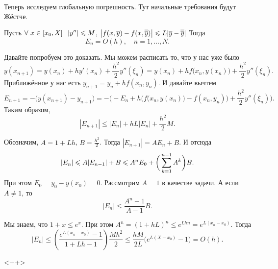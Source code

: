 Теперь исследуем глобальную погрешность. Тут начальные требования будут Жёстче.
\begin{The}
Пусть $\forall\ x\in [x_0,X]\pau |y''|\le M$, $\big|f(x,\overline{y}) - f(x,\overline{\overline{y}})\big| \leqslant L |\overline{y} - \overline{\overline{y}}|$ Тогда
\[
  E_n = O(h),\quad n=1,\dots, N.
\]
\end{The}
\begin{Proof}
Давайте попробуем это доказать.
Мы можем расписать то, что у нас уже было
\[
  y(x_{n+1}) = y(x_n) + h y'(x_n) + \frac{h^2}2y''(\xi_n) = 
  y(x_n) + h f\big(x_n,y(x_n)\big) + \frac{h^2}2y''(\xi_n).
\]
Приближённое у нас есть $y_{n+1} = y_n + h f(x_n,y_n)$. И давайте вычтем
\[
  E_{n+1} = -\big(y(x_{n+1}) - y_{n+1}\big) = -\bigg(-E_n + h \Big(f\big(x_n,y(x_n)\big) - f(x_n,y_n)\Big) + \frac{h^2}2y''(\xi_n)\bigg).
\]
Таким образом, 
\[
  |E_{n+1}|\le |E_n| + h L |E_n| + \frac {h^2}2 M.
\]

Обозначим, $A= 1+ Lh$, $B = \frac{h^2}2$. Тогда $|E_{n+1}| = A E_n + B$. И отсюда
\[
  |E_n| \leqslant A |E_{n-1}| + B \leqslant A^n E_0 + \bigg(\sum\limits_{k = 1}^{n-1} A^k\bigg)B.
\]
При этом $E_0 = y_0 - y(x_0)=0$. Рассмотрим $A=1$  в качестве задачи. А если $A\ne 1$, то 
\[
  |E_n| \le \frac{A^n-1}{A-1} B.
\]

Мы знаем, что $1+x\le e^x$. При этом $A^n = (1+hL)^n\le e^{Lhn} = e^{L(x_n-x_0)}$. Тогда
\[
  |E_n| \le \left( \frac{e^{L(x_n-x_0)} - 1}{1+ Lh - 1} \right)\frac{Mh^2}2 \le \frac{h M}{2L} \big(e^{L(X-x_0)}-1\big) = O(h).
\]
\end{Proof}<++>
